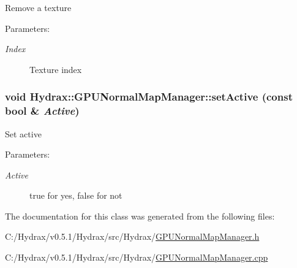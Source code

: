 Remove a texture \begin{Desc}
\item[Parameters:]
\begin{description}
\item[{\em Index}]Texture index \end{description}
\end{Desc}
\hypertarget{class_hydrax_1_1_g_p_u_normal_map_manager_c58c786ad6359d8f70b5ecd0bc30464b}{
\subsubsection[{setActive}]{\setlength{\rightskip}{0pt plus 5cm}void Hydrax::GPUNormalMapManager::setActive (const bool \& {\em Active})}}
\label{class_hydrax_1_1_g_p_u_normal_map_manager_c58c786ad6359d8f70b5ecd0bc30464b}


Set active \begin{Desc}
\item[Parameters:]
\begin{description}
\item[{\em Active}]true for yes, false for not \end{description}
\end{Desc}


The documentation for this class was generated from the following files:\begin{CompactItemize}
\item 
C:/Hydrax/v0.5.1/Hydrax/src/Hydrax/\hyperlink{_g_p_u_normal_map_manager_8h}{GPUNormalMapManager.h}\item 
C:/Hydrax/v0.5.1/Hydrax/src/Hydrax/\hyperlink{_g_p_u_normal_map_manager_8cpp}{GPUNormalMapManager.cpp}\end{CompactItemize}
